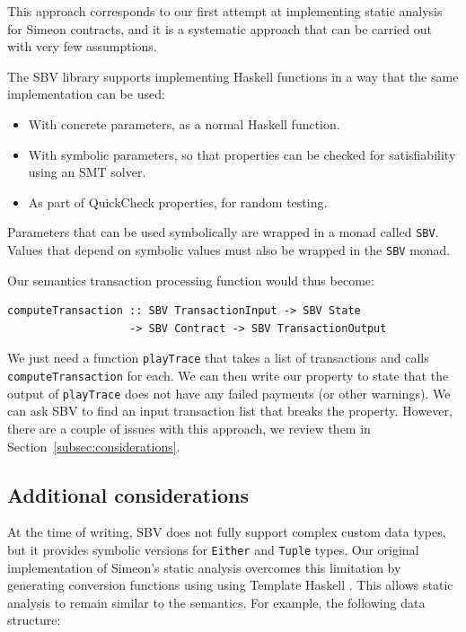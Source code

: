 \documentclass[english,runningheads]{llncs}
\begin{document}
This approach corresponds to our first attempt at implementing static
analysis for Simeon contracts, and it is a systematic approach that
can be carried out with very few assumptions. 

The SBV library supports implementing Haskell functions in a way that
the same implementation can be used:
\begin{itemize}
\item With concrete parameters, as a normal Haskell function.
\item With symbolic parameters, so that properties can be checked for satisfiability
using an SMT solver.
\item As part of QuickCheck properties, for random testing.
\end{itemize}
Parameters that can be used symbolically are wrapped in a monad called
\texttt{SBV}. Values that depend on symbolic values must also be wrapped in the \texttt{SBV} monad.


Our semantics transaction processing function would thus become:

\begin{verbatim}
computeTransaction :: SBV TransactionInput -> SBV State
                   -> SBV Contract -> SBV TransactionOutput
\end{verbatim}

We just need a function \texttt{playTrace} that takes a list of
transactions and calls \texttt{computeTransaction} for each. 
We can then write our property to state that the output of
\texttt{playTrace} does not have any failed payments (or other warnings). We
can ask SBV to find an input transaction list that breaks the property.
However, there are a couple of issues with this approach,
we review them in Section~\ref{subsec:considerations}.

\subsection{Additional considerations\label{subsec:considerations}}

At the time of writing, SBV does not fully support complex custom data types,
but it provides symbolic versions for \texttt{Either} and \texttt{Tuple} types.
Our original implementation of Simeon's static analysis overcomes this limitation
by generating conversion functions using using Template Haskell
\cite{sheard2002template}. This allows static analysis to remain similar to the semantics. For example, the following data structure:
\end{document}
